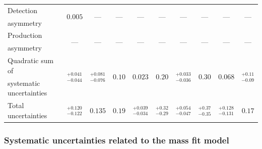 \documentclass[12pt,a4paper]{article}
\begin{document}
\begin{table}[htbp]
\begin{center}
\begin{tabular}{lccccccccc}
Detection & \multirow{2}{*}{$0.005$} & \multirow{2}{*}{---} & \multirow{2}{*}{---}& \multirow{2}{*}{---}& \multirow{2}{*}{---}& \multirow{2}{*}{---} & \multirow{2}{*}{---} & \multirow{2}{*}{---} & \multirow{2}{*}{---} \\
asymmetry  & & & & & & & & & \\
Production & \multirow{2}{*}{---} & \multirow{2}{*}{---} & \multirow{2}{*}{---}& \multirow{2}{*}{---}& \multirow{2}{*}{---}& \multirow{2}{*}{---} & \multirow{2}{*}{---} & \multirow{2}{*}{---} & \multirow{2}{*}{---} \\
asymmetry & & & & & & & & & \\ [+0.04in]
\hline 
Quadratic sum of & \multirow{2}{*}{$^{+	0.041	}_{-	0.044	}$} & \multirow{2}{*}{$^{+	0.081	}_{-	0.076	}$} & \multirow{2}{*}{$0.10$}& \multirow{2}{*}{$0.023$}& \multirow{2}{*}{$ 0.20 $}& \multirow{2}{*}{$^{+	0.033	}_{-	0.036	}$} & \multirow{2}{*}{$0.30$} & \multirow{2}{*}{$	0.068 $} & \multirow{2}{*}{$^{+	0.11	}_{-	0.09	}$} \\  
systematic uncertainties & & & & & & & & & \\ \hline
\multirow{2}{*}{Total uncertainties} & \multirow{2}{*}{$^{+	0.120	}_{-	0.122	}$} & \multirow{2}{*}{$0.135$} & \multirow{2}{*}{$0.19$}& \multirow{2}{*}{$^{+	0.039	}_{-	0.034	}$}& \multirow{2}{*}{$^{+	0.32	}_{-	0.29	}$}& \multirow{2}{*}{$^{+	0.054	}_{-	0.047	}$} & \multirow{2}{*}{$^{+	0.37	}_{-	0.35	}$} & \multirow{2}{*}{$^{+	0.128	}_{-	0.131	}$} & \multirow{2}{*}{$0.17$} \\  
   & & & & & & & & & \\
\hline
\end{tabular}
\label{tab:systSwave}
\end{center}
\end{table}


\subsubsection{Systematic uncertainties related to the mass fit model}\label{sec:massFitSystematics}
\end{document}
